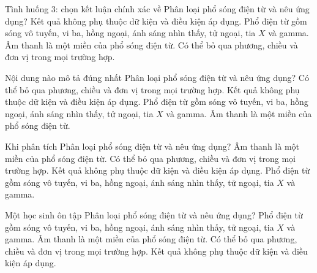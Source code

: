 \begin{ex}
Tình huống 3: chọn kết luận chính xác về Phân loại phổ sóng điện từ và nêu ứng dụng?
\choice
{Kết quả không phụ thuộc dữ kiện và điều kiện áp dụng.}
{\True Phổ điện từ gồm sóng vô tuyến, vi ba, hồng ngoại, ánh sáng nhìn thấy, tử ngoại, tia $X$ và gamma.}
{Âm thanh là một miền của phổ sóng điện từ.}
{Có thể bỏ qua phương, chiều và đơn vị trong mọi trường hợp.}
\end{ex}

\begin{ex}
Nội dung nào mô tả đúng nhất Phân loại phổ sóng điện từ và nêu ứng dụng?
\choice
{Có thể bỏ qua phương, chiều và đơn vị trong mọi trường hợp.}
{Kết quả không phụ thuộc dữ kiện và điều kiện áp dụng.}
{\True Phổ điện từ gồm sóng vô tuyến, vi ba, hồng ngoại, ánh sáng nhìn thấy, tử ngoại, tia $X$ và gamma.}
{Âm thanh là một miền của phổ sóng điện từ.}
\end{ex}

\begin{ex}
Khi phân tích Phân loại phổ sóng điện từ và nêu ứng dụng?
\choice
{Âm thanh là một miền của phổ sóng điện từ.}
{Có thể bỏ qua phương, chiều và đơn vị trong mọi trường hợp.}
{Kết quả không phụ thuộc dữ kiện và điều kiện áp dụng.}
{\True Phổ điện từ gồm sóng vô tuyến, vi ba, hồng ngoại, ánh sáng nhìn thấy, tử ngoại, tia $X$ và gamma.}
\end{ex}

\begin{ex}
Một học sinh ôn tập Phân loại phổ sóng điện từ và nêu ứng dụng?
\choice
{\True Phổ điện từ gồm sóng vô tuyến, vi ba, hồng ngoại, ánh sáng nhìn thấy, tử ngoại, tia $X$ và gamma.}
{Âm thanh là một miền của phổ sóng điện từ.}
{Có thể bỏ qua phương, chiều và đơn vị trong mọi trường hợp.}
{Kết quả không phụ thuộc dữ kiện và điều kiện áp dụng.}
\end{ex}


